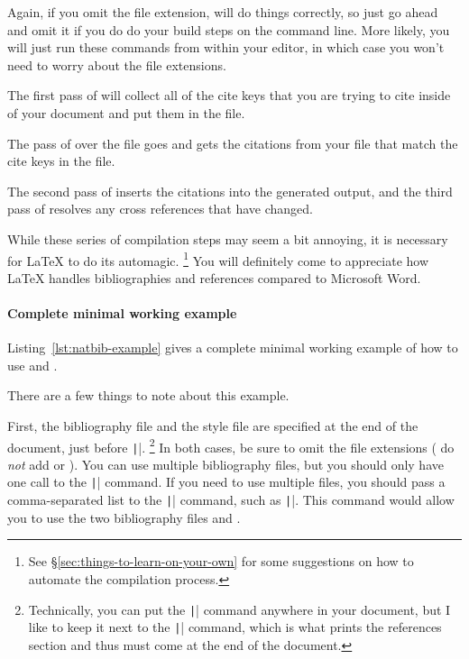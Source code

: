 Again, if you omit the  file extension,  will do things correctly, so just go ahead and omit it if you do do your build steps on the command line.
More likely, you will just run these commands from within your editor, in which case you won't need to worry about the file extensions.

The first pass of  will collect all of the cite keys that you are trying to cite inside of your  document and put them in the  file.

The pass of  over the  file goes and gets the citations from your  file that match the cite keys in the  file.

The second pass of  inserts the citations into the generated output, and the third pass of  resolves any cross references that have changed.

While these series of compilation steps may seem a bit annoying, it is necessary for \LaTeX{} to do its automagic.%
\footnote{%
See \S\ref{sec:things-to-learn-on-your-own} for some suggestions on how to automate the compilation process.%
}
You will definitely come to appreciate how \LaTeX{} handles bibliographies and references compared to Microsoft Word.

\paragraph{Complete minimal working example}

Listing~\ref{lst:natbib-example} gives a complete minimal working example of how to use  and .

There are a few things to note about this example.

First, the bibliography file and the style file are specified at the end of the document, just before \texttt||.%
\footnote{%
Technically, you can put the \texttt|| command anywhere in your document, but I like to keep it next to the \texttt|| command, which is what prints the references section and thus must come at the end of the document.%
}
In both cases, be sure to omit the file extensions (\IE{} do \emph{not} add  or ).
You can use multiple bibliography files, but you should only have one call to the \texttt|| command.
If you need to use multiple  files, you should pass a comma-separated list to the \texttt|| command, such as \texttt||.
This command would allow you to use the two bibliography files  and .


